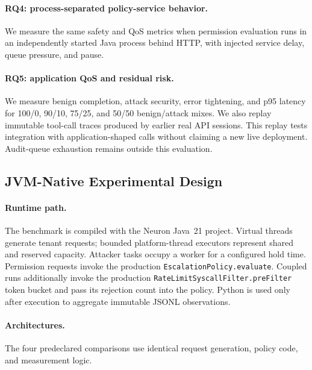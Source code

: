 \paragraph{RQ4: process-separated policy-service behavior.}
We measure the same safety and QoS metrics when permission evaluation runs in
an independently started Java process behind HTTP, with injected service
delay, queue pressure, and pause.

\paragraph{RQ5: application QoS and residual risk.}
We measure benign completion, attack security, error tightening, and p95
latency for 100/0, 90/10, 75/25, and 50/50 benign/attack mixes. We also replay
immutable tool-call traces produced by earlier real API sessions. This replay
tests integration with application-shaped calls without claiming a new live
deployment. Audit-queue exhaustion remains outside this evaluation.

\subsection{JVM-Native Experimental Design}
\label{sec:eval-starvation}

\paragraph{Runtime path.}
The benchmark is compiled with the Neuron Java~21 project. Virtual threads
generate tenant requests; bounded platform-thread executors represent shared
and reserved capacity. Attacker tasks occupy a worker for a configured hold
time. Permission requests invoke the production
\texttt{EscalationPolicy.evaluate}. Coupled runs additionally invoke the
production \texttt{RateLimitSyscallFilter.preFilter} token bucket and pass
its rejection count into the policy. Python is used only after execution to
aggregate immutable JSONL observations.

\paragraph{Architectures.}
The four predeclared comparisons use identical request generation, policy
code, and measurement logic.

